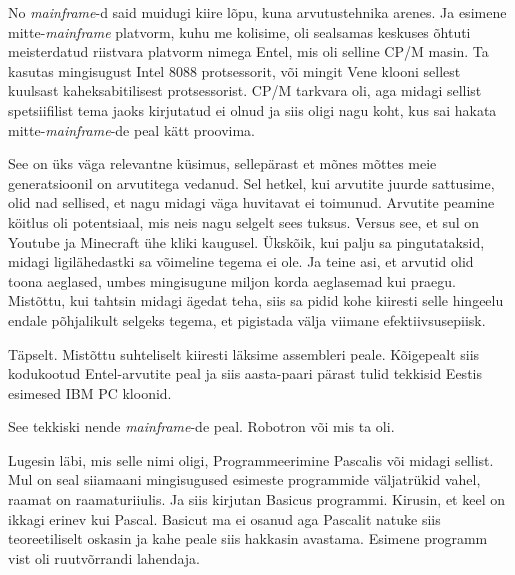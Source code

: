 No \emph{mainframe}-d said muidugi kiire lõpu, kuna arvutustehnika arenes. Ja esimene mitte-\emph{mainframe} platvorm, kuhu me kolisime, oli sealsamas keskuses õhtuti meisterdatud riistvara platvorm nimega Entel, mis oli selline CP/M masin. Ta kasutas mingisugust Intel 8088 protsessorit, või mingit Vene klooni sellest kuulsast kaheksabitilisest protsessorist. CP/M tarkvara oli, aga midagi sellist spetsiifilist tema jaoks kirjutatud ei olnud ja  siis oligi nagu koht, kus sai hakata mitte-\emph{mainframe}-de peal kätt proovima. 


See on üks väga relevantne küsimus, sellepärast et mõnes mõttes meie generatsioonil on arvutitega vedanud. Sel hetkel, kui arvutite juurde sattusime, olid nad sellised, et nagu midagi väga huvitavat ei toimunud. Arvutite peamine köitlus oli potentsiaal, mis neis nagu selgelt sees tuksus. Versus see, et sul on Youtube ja Minecraft ühe kliki kaugusel. Ükskõik, kui palju sa  pingutataksid, midagi  ligilähedastki sa võimeline tegema ei ole. Ja teine asi, et arvutid olid toona aeglased,  umbes mingisugune miljon korda aeglasemad kui praegu. Mistõttu, kui tahtsin midagi ägedat teha, siis sa pidid kohe kiiresti selle hingeelu endale põhjalikult selgeks tegema, et pigistada välja viimane efektiivsusepiisk.


Täpselt. Mistõttu suhteliselt kiiresti läksime assembleri peale. Kõigepealt siis kodukootud Entel-arvutite peal ja siis aasta-paari pärast tulid tekkisid Eestis esimesed IBM PC kloonid. 


See tekkiski nende \emph{mainframe}-de peal. Robotron või mis ta oli.


Lugesin läbi, mis selle nimi oligi, Programmeerimine Pascalis või midagi sellist. Mul on seal siiamaani mingisugused esimeste programmide väljatrükid  vahel, raamat on raamaturiiulis. Ja siis kirjutan Basicus programmi. Kirusin, et keel on ikkagi erinev kui Pascal. Basicut ma ei osanud aga Pascalit natuke siis teoreetiliselt oskasin ja kahe peale siis hakkasin avastama. Esimene programm vist oli ruutvõrrandi lahendaja.

